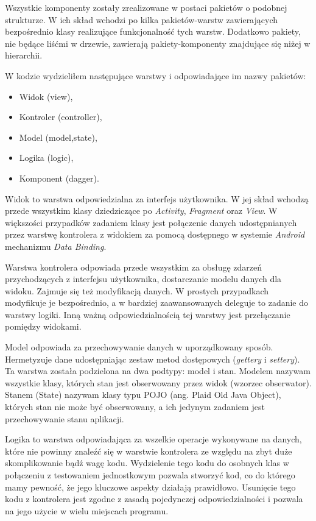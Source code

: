 \documentclass[openright]{xmgr}
\begin{document}
Wszystkie komponenty zostały zrealizowane w postaci pakietów o podobnej strukturze. W ich skład wchodzi po kilka pakietów-warstw zawierających bezpośrednio klasy realizujące funkcjonalność tych warstw. Dodatkowo pakiety, nie będące liśćmi w drzewie, zawierają pakiety-komponenty znajdujące się niżej w hierarchii.

W kodzie wydzieliłem następujące warstwy i odpowiadające im nazwy pakietów:
\begin{itemize}
	\item Widok (view),
	\item Kontroler (controller),
	\item Model (model,state),
	\item Logika (logic),
	\item Komponent (dagger).
\end{itemize}

Widok to warstwa odpowiedzialna za interfejs użytkownika. W jej skład wchodzą przede wszystkim klasy dziedziczące po \textit{Activity}, \textit{Fragment} oraz \textit{View}. W większości przypadków zadaniem klasy jest połączenie danych udostępnianych przez warstwę kontrolera z widokiem za pomocą dostępnego w systemie \textit{Android} mechanizmu \textit{Data Binding}\cite{AndroidSDK:2017:Doc}.

Warstwa kontrolera odpowiada przede wszystkim za obsługę zdarzeń przychodzących z interfejsu użytkownika, dostarczanie modelu danych dla widoku. Zajmuje się też modyfikacją danych. W prostych przypadkach modyfikuje je bezpośrednio, a w bardziej zaawansowanych deleguje to zadanie do warstwy logiki. Inną ważną odpowiedzialnością tej warstwy jest przełączanie pomiędzy widokami. 

Model odpowiada za przechowywanie danych w uporządkowany sposób. Hermetyzuje dane udostępniając zestaw metod dostępowych (\textit{gettery} i \textit{settery}). Ta warstwa została podzielona na dwa podtypy: model i stan. Modelem nazywam wszystkie klasy, których stan jest obserwowany przez widok (wzorzec obserwator). Stanem (State) nazywam klasy typu POJO (ang. Plaid Old Java Object), których stan nie może być obserwowany, a ich jedynym zadaniem jest przechowywanie stanu aplikacji. 

Logika to warstwa odpowiadająca za wszelkie operacje wykonywane na danych, które nie powinny znaleźć się w warstwie kontrolera ze względu na zbyt duże skomplikowanie bądź wagę kodu. Wydzielenie tego kodu do osobnych klas w połączeniu z testowaniem jednostkowym pozwala stworzyć kod, co do którego mamy pewność, że jego kluczowe aspekty działają prawidłowo. Usunięcie tego kodu z kontrolera jest zgodne z zasadą pojedynczej odpowiedzialności \cite{CleanCode:2005} i pozwala na jego użycie w wielu miejscach programu. 
\end{document}

